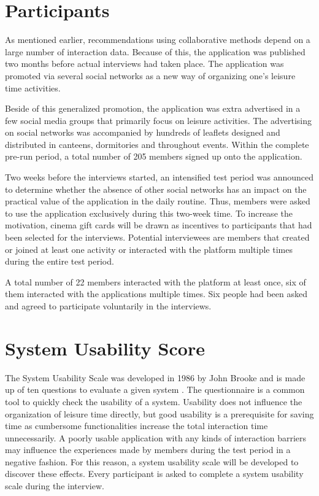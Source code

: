 \documentclass[12pt,numbers=noenddot,parskip,bibliography=totocnumbered,listof=totocnumbered,draft]{scrreprt}
\begin{document}
\section{Participants}
As mentioned earlier, recommendations using collaborative methods depend on a large number of interaction data. Because of this, the application was published two months before actual interviews had taken place. The application was promoted via several social networks as a new way of organizing one's leisure time activities.

Beside of this generalized promotion, the application was extra advertised in a few social media groups that primarily focus on leisure activities. The advertising on social networks was accompanied by hundreds of leaflets designed and distributed in canteens, dormitories and throughout events. Within the complete pre-run period, a total number of 205 members signed up onto the application. 

Two weeks before the interviews started, an intensified test period was announced to determine whether the absence of other social networks has an impact on the practical value of the application in the daily routine. Thus, members were asked to use the application exclusively during this two-week time. To increase the motivation, cinema gift cards will be drawn as incentives to participants that had been selected for the interviews. Potential interviewees are members that created or joined at least one activity or interacted with the platform multiple times during the entire test period. 

A total number of 22 members interacted with the platform at least once, six of them interacted with the applications multiple times. Six people had been asked and agreed to participate voluntarily in the interviews.

\section{System Usability Score}
The System Usability Scale was developed in 1986 by John Brooke and is made up of ten questions to evaluate a given system \citep[p.189-194]{brooke1996}. The questionnaire is a common tool to quickly check the usability of a system. Usability does not influence the organization of leisure time directly, but good usability is a prerequisite for saving time as cumbersome functionalities increase the total interaction time unnecessarily. A poorly usable application with any kinds of interaction barriers may influence the experiences made by members during the test period in a negative fashion. For this reason, a system usability scale will be developed to discover these effects. Every participant is asked to complete a system usability scale during the interview.
\end{document}
